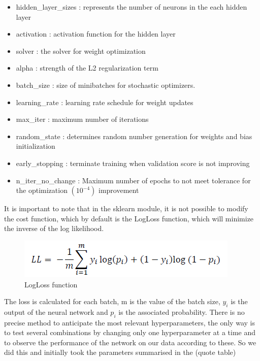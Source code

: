 \begin{itemize}
    \item hidden\_layer\_sizes : represents the number of neurons in the each hidden layer
    \item activation : activation function for the hidden layer
    \item solver : the solver for weight optimization
    \item alpha : strength of the L2 regularization term
    \item batch\_size : size of minibatches for stochastic optimizers.
    \item learning\_rate : learning rate schedule for weight updates
    \item max\_iter : maximum number of iterations
    \item random\_state : determines random number generation for weights and bias initialization
    \item early\_stopping : terminate training when validation score is not improving
    \item n\_iter\_no\_change : Maximum number of epochs to not meet tolerance for the optimization \((10^{-4})\) improvement 
\end{itemize}

It is important to note that in the sklearn module, it is not possible to modify the cost function, which by default is the LogLoss function, which will minimize the inverse of the log likelihood.

\begin{figure}
    \center
    \includegraphics[scale=0.32]{img/logloss.png}
    \caption{LogLoss function}
    \label{logloss}
\end{figure}
The loss is calculated for each batch, m is the value of the batch size, \(y_i\) is the output of the neural network and \(p_i\) is the associated probability.
There is no precise method to anticipate the most relevant hyperparameters, the only way is to test several combinations by changing only one hyperparameter at a time and to observe the performance of the network on our data according to these. So we did this and initially took the parameters summarised in the (quote table)

